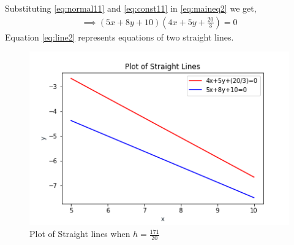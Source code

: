 \documentclass[journal,12pt,twocolumn]{IEEEtran}
\begin{document}
Substituting \eqref{eq:normal11} and \eqref{eq:const11} in \eqref{eq:maineq2} we get,
\begin{multline}
\implies \boxed{(5x+8y+10)(4x+5y+\frac{20}{3}) = 0} \label{eq:line2}
\end{multline}
Equation \eqref{eq:line2} represents equations of two straight lines.
\renewcommand{\thefigure}{\arabic{figure}}
\begin{figure}[h!]
	\centering
	\includegraphics[width=\columnwidth]{st2.png}
	\caption{Plot of Straight lines when $h=\frac{171}{20}$}
	\label{myfig}
\end{figure}\\
\\
\end{document}
